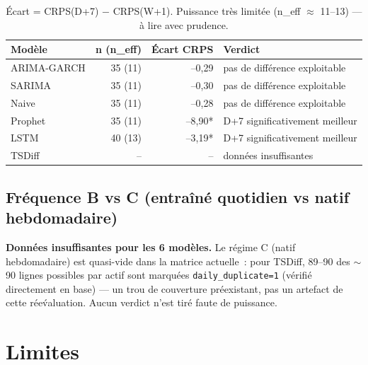 \documentclass[11pt]{article}
\begin{document}
\begin{table}[h]
\centering
\begin{tabular}{lrrl}
\toprule
Mod\`ele & n (n\_eff) & \'Ecart CRPS & Verdict \\
\midrule
ARIMA-GARCH & 35 (11) & --0,29 & pas de diff\'erence exploitable \\
SARIMA      & 35 (11) & --0,30 & pas de diff\'erence exploitable \\
Naive       & 35 (11) & --0,28 & pas de diff\'erence exploitable \\
Prophet     & 35 (11) & --8,90* & D+7 significativement meilleur \\
LSTM        & 40 (13) & --3,19* & D+7 significativement meilleur \\
TSDiff      & --      & -- & donn\'ees insuffisantes \\
\bottomrule
\end{tabular}
\caption{\'Ecart = CRPS(D+7) $-$ CRPS(W+1). Puissance tr\`es limit\'ee
(n\_eff $\approx$ 11--13) --- \`a lire avec prudence.}
\end{table}

\subsection{Fr\'equence B vs C (entra\^in\'e quotidien vs natif hebdomadaire)}

\textbf{Donn\'ees insuffisantes pour les 6 mod\`eles.} Le r\'egime C
(natif hebdomadaire) est quasi-vide dans la matrice actuelle~: pour TSDiff,
89--90 des $\sim$90 lignes possibles par actif sont marqu\'ees
\texttt{daily\_duplicate=1} (v\'erifi\'e directement en base) --- un trou de
couverture pr\'eexistant, pas un artefact de cette r\'ee\'valuation. Aucun
verdict n'est tir\'e faute de puissance.

\section{Limites}
\end{document}
